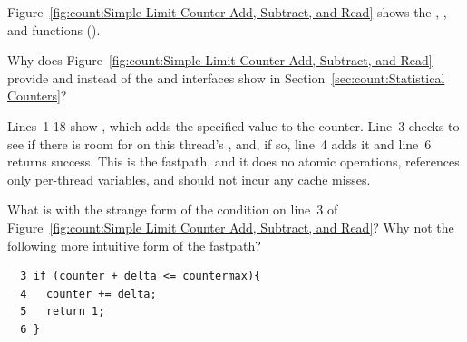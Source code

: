 Figure~\ref{fig:count:Simple Limit Counter Add, Subtract, and Read}
shows the , , and 
functions ().


\QuickQuiz{}
	Why does
	Figure~\ref{fig:count:Simple Limit Counter Add, Subtract, and Read}
	provide  and  instead of the
	 and  interfaces show in
	Section~\ref{sec:count:Statistical Counters}?
 \QuickQuizEnd

Lines~1-18 show , which adds the specified value 
to the counter.
Line~3 checks to see if there is room for  on this thread's
, and, if so, line~4 adds it and line~6 returns success.
This is the  fastpath, and it does no atomic operations,
references only per-thread variables, and should not incur any cache misses.

\QuickQuiz{}
	What is with the strange form of the condition on line~3 of
	Figure~\ref{fig:count:Simple Limit Counter Add, Subtract, and Read}?
	Why not the following more intuitive form of the fastpath?

	\vspace{5pt}
	\begin{minipage}[t]{\columnwidth}
	\small
	\begin{verbatim}
  3 if (counter + delta <= countermax){
  4   counter += delta;
  5   return 1;
  6 }
	\end{verbatim}
	\end{minipage}
	\vspace{5pt}
 \QuickQuizEnd

